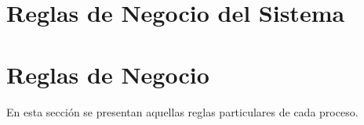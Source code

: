 

\section{Reglas de Negocio del Sistema}



\section{Reglas de Negocio}

En esta sección se presentan aquellas reglas particulares de cada proceso.

%
%
%

%


